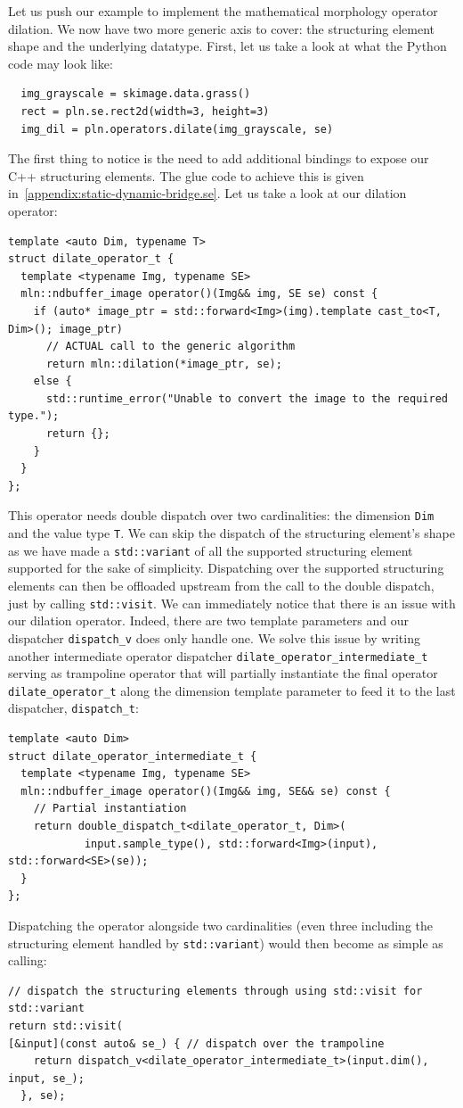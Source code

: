 Let us push our example to implement the mathematical morphology operator dilation. We now have two more generic axis to
cover: the structuring element shape and the underlying datatype. First, let us take a look at what the Python code may
look like:
\begin{verbatim}
  img_grayscale = skimage.data.grass()
  rect = pln.se.rect2d(width=3, height=3)
  img_dil = pln.operators.dilate(img_grayscale, se)
\end{verbatim}
The first thing to notice is the need to add additional bindings to expose our C++ structuring elements. The glue code
to achieve this is given in~\cref{appendix:static-dynamic-bridge.se}. Let us take a look at our dilation operator:
\begin{verbatim}
template <auto Dim, typename T>
struct dilate_operator_t {
  template <typename Img, typename SE>
  mln::ndbuffer_image operator()(Img&& img, SE se) const {
    if (auto* image_ptr = std::forward<Img>(img).template cast_to<T, Dim>(); image_ptr)
      // ACTUAL call to the generic algorithm
      return mln::dilation(*image_ptr, se);
    else {
      std::runtime_error("Unable to convert the image to the required type.");
      return {};
    }
  }
};
\end{verbatim}
This operator needs double dispatch over two cardinalities: the dimension \texttt{Dim} and the value type \texttt{T}. We
can skip the dispatch of the structuring element's shape as we have made a \texttt{std::variant} of all the supported
structuring element supported for the sake of simplicity. Dispatching over the supported structuring elements can then
be offloaded upstream from the call to the double dispatch, just by calling \texttt{std::visit}. We can immediately
notice that there is an issue with our dilation operator. Indeed, there are two template parameters and our dispatcher
\texttt{dispatch\_v} does only handle one. We solve this issue by writing another intermediate operator dispatcher
\texttt{dilate\_operator\_intermediate\_t} serving as trampoline operator that will partially instantiate the final
operator \texttt{dilate\_operator\_t} along the dimension template parameter to feed it to the last dispatcher,
\texttt{dispatch\_t}:
\begin{verbatim}
template <auto Dim>
struct dilate_operator_intermediate_t {
  template <typename Img, typename SE>
  mln::ndbuffer_image operator()(Img&& img, SE&& se) const {
    // Partial instantiation
    return double_dispatch_t<dilate_operator_t, Dim>(
            input.sample_type(), std::forward<Img>(input), std::forward<SE>(se));
  }
};
\end{verbatim}
Dispatching the operator alongside two cardinalities (even three including the structuring element handled by
\texttt{std::variant}) would then become as simple as calling:
\begin{verbatim}
// dispatch the structuring elements through using std::visit for std::variant
return std::visit(
[&input](const auto& se_) { // dispatch over the trampoline
    return dispatch_v<dilate_operator_intermediate_t>(input.dim(), input, se_);
  }, se);
\end{verbatim}

